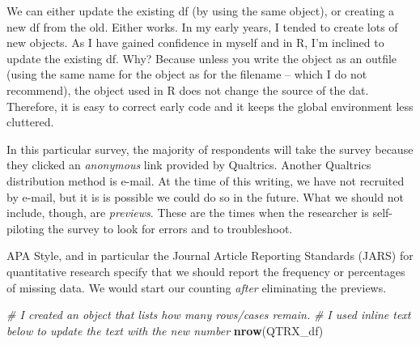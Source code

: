 \documentclass[
  11pt,
]{book}
\newenvironment{Shaded}{\begin{snugshade}}{\end{snugshade}}
\newcommand{\CommentTok}[1]{\textcolor[rgb]{0.37,0.37,0.37}{\textit{#1}}}
\newcommand{\FunctionTok}[1]{\textcolor[rgb]{0.27,0.27,0.27}{\textbf{#1}}}
\newcommand{\NormalTok}[1]{#1}
\newcommand{\OtherTok}[1]{\textcolor[rgb]{0.37,0.37,0.37}{#1}}
\newcommand{\SpecialCharTok}[1]{\textcolor[rgb]{0.43,0.43,0.43}{\textbf{#1}}}
\newcommand{\StringTok}[1]{\textcolor[rgb]{0.5,0.5,0.5}{#1}}
\begin{document}
We can either update the existing df (by using the same object), or creating a new df from the old. Either works. In my early years, I tended to create lots of new objects. As I have gained confidence in myself and in R, I'm inclined to update the existing df. Why? Because unless you write the object as an outfile (using the same name for the object as for the filename -- which I do not recommend), the object used in R does not change the source of the dat. Therefore, it is easy to correct early code and it keeps the global environment less cluttered.

In this particular survey, the majority of respondents will take the survey because they clicked an \emph{anonymous} link provided by Qualtrics. Another Qualtrics distribution method is e-mail. At the time of this writing, we have not recruited by e-mail, but it is is possible we could do so in the future. What we should not include, though, are \emph{previews}. These are the times when the researcher is self-piloting the survey to look for errors and to troubleshoot.

\begin{Shaded}
\end{Shaded}

APA Style, and in particular the Journal Article Reporting Standards (JARS) for quantitative research specify that we should report the frequency or percentages of missing data. We would start our counting \emph{after} eliminating the previews.

\begin{Shaded}
\begin{Highlighting}[]
\CommentTok{\# I created an object that lists how many rows/cases remain.}
\CommentTok{\# I used inline text below to update the text with the new number}
\FunctionTok{nrow}\NormalTok{(QTRX\_df)}
\end{Highlighting}
\end{Shaded}
\end{document}
